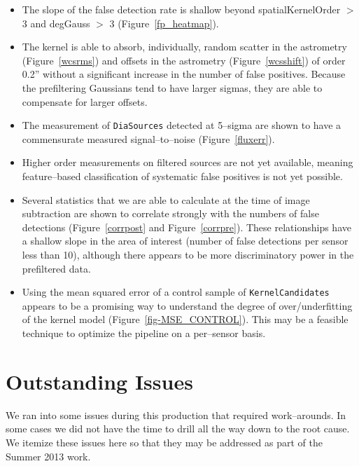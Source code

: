 \documentclass[prd, nofootinbib, floatfix, 11pt,tightenlines,times]{article}
\begin{document}
\begin{itemize}

\item The slope of the false detection rate is shallow beyond spatialKernelOrder $>$ 3 and
  degGauss $>$ 3 (Figure~\ref{fp_heatmap}).


\item The kernel is able to absorb, individually, random scatter in the astrometry (Figure~\ref{wcsrms})
  and offsets in the astrometry  (Figure~\ref{wcsshift}) of order 0.2''
  without a significant increase in the number of false positives.  Because the prefiltering
  Gaussians tend to have larger sigmas, they are able to compensate for larger offsets.


\item The measurement of {\tt DiaSources} detected at 5--sigma are
  shown to have a commensurate measured signal--to--noise
  (Figure~\ref{fluxerr}).  

\item Higher order measurements on filtered sources are not yet available,
  meaning feature--based classification of systematic false positives is not yet possible.


\item Several statistics that we are able to calculate at the time of
  image subtraction are shown to correlate strongly with the numbers
  of false detections (Figure~\ref{corrpost} and
  Figure~\ref{corrpre}).  These relationships have a shallow
  slope in the area of interest (number of false detections per sensor
  less than 10), although there appears to be more discriminatory
  power in the prefiltered data.

\item Using the mean squared error of a control sample of {\tt KernelCandidates}
  appears to be a promising way to understand the degree of over/underfitting
  of the kernel model (Figure~\ref{fig-MSE_CONTROL}).  This may be a 
  feasible technique to optimize the pipeline on a per--sensor basis.

\end{itemize}

\section{Outstanding Issues}
We ran into some issues during this production that required work--arounds.  
In some cases we did not have the time to drill all the way down
to the root cause.  We itemize these issues here so that they may be addressed 
as part of the Summer 2013 work.
\end{document}
